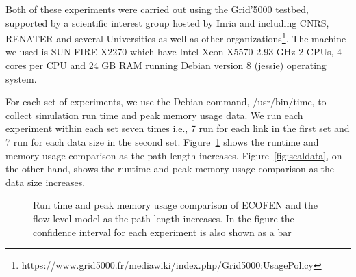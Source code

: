 Both of these experiments were carried out using the Grid'5000 testbed, supported by a scientific interest group hosted by Inria and including CNRS, RENATER and several Universities as well as other organizations\footnote{https://www.grid5000.fr/mediawiki/index.php/Grid5000:UsagePolicy}. The machine we used is SUN FIRE X2270 which have Intel Xeon X5570 2.93 GHz 2 CPUs, 4 cores per CPU and 24 GB RAM running Debian version 8 (jessie) operating system.

For each set of experiments, we use the Debian command, /usr/bin/time, to collect simulation run time and peak memory usage data. We run each experiment within each set seven times i.e., 7 run for each link in the first set and 7 run for each data size in the second set. Figure~\ref{fig:scallinks} shows the runtime and memory usage comparison as the path length increases. Figure~\ref{fig:scaldata}, on the other hand, shows the runtime and peak memory usage comparison as the data size increases.

\begin{figure}[ht]
	\centering
	\centering
	\caption{Run time and peak memory usage comparison of ECOFEN and the flow-level model as the path length increases. In the figure the confidence interval for each experiment is also shown as a bar}
	\label{fig:scallinks}
\end{figure}

